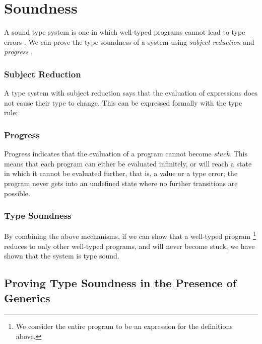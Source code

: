 \section{Soundness}

A sound type system is one in which well-typed programs cannot lead to type errors \cite{Wright1994}. We can prove the type soundness of a system using \textit{subject reduction} and \textit{progress} \cite{Igarashi2001}.

\subsubsection{Subject Reduction}

A type system with subject reduction says that the evaluation of expressions does not cause their type to change. This can be expressed formally with the type rule:

\begin{mathpar}
\end{mathpar}

\subsubsection{Progress}

Progress indicates that the evaluation of a program cannot become \textit{stuck}. This means that each program can either be evaluated infinitely, or will reach a state in which it cannot be evaluated further, that is, a value or a type error; the program never gets into an undefined state where no further transitions are possible.

\subsubsection{Type Soundness}

By combining the above mechanisms, if we can show that a well-typed program \footnote{We consider the entire program to be an expression for the definitions above.} reduces to only other well-typed programs, and will never become stuck, we have shown that the system is type sound.

\subsection{Proving Type Soundness in the Presence of Generics}

